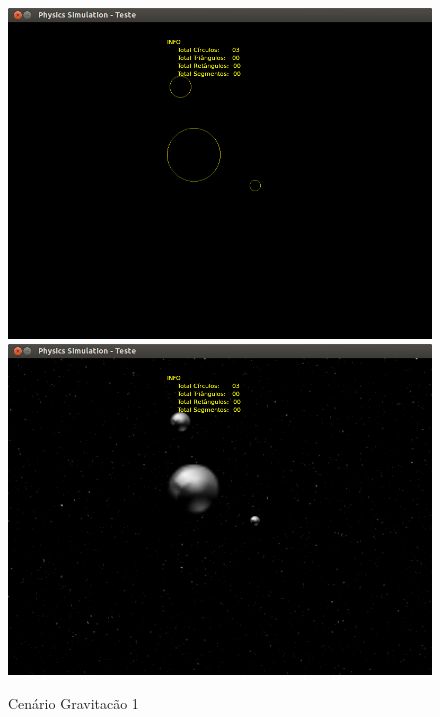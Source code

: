   \begin{figure}
	\centering
	\caption{Cenário Gravitacão 1}
    \includegraphics[scale=0.4]{images/cenario-gravitacao.png}
    \includegraphics[scale=0.4]{images/cenario-gravitacao-2.png}
  \end{figure}

